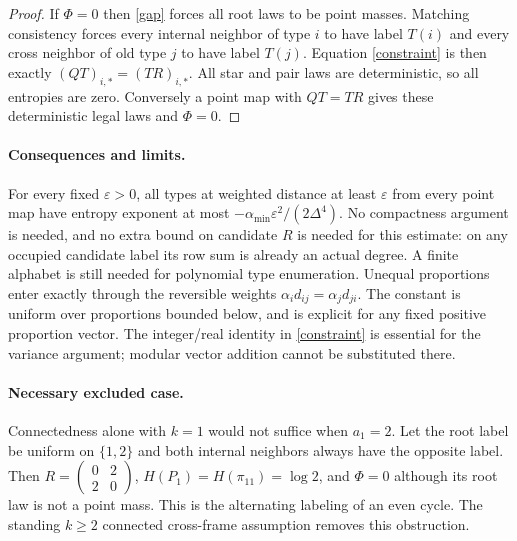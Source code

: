 \documentclass[11pt]{article}
\begin{document}
\begin{proof}
If $\Phi=0$ then \eqref{gap} forces all root laws to be point masses.
Matching consistency forces every internal neighbor of type $i$ to have
label $T(i)$ and every cross neighbor of old type $j$ to have label $T(j)$.
Equation \eqref{constraint} is then exactly $(QT)_{i,*}=(TR)_{i,*}$.
All star and pair laws are deterministic, so all entropies are zero.
Conversely a point map with $QT=TR$ gives these deterministic legal laws
and $\Phi=0$.
\end{proof}

\paragraph{Consequences and limits.}
For every fixed $\varepsilon>0$, all types at weighted distance at least
$\varepsilon$ from every point map have entropy exponent at most
$-\alpha_{\min}\varepsilon^2/(2\Delta^4)$. No compactness argument is
needed, and no extra bound on candidate $R$ is needed for this estimate:
on any occupied candidate label its row sum is already an actual degree.
A finite alphabet is still needed for polynomial type enumeration.
Unequal proportions enter exactly through the reversible weights
$\alpha_i d_{ij}=\alpha_jd_{ji}$. The constant is uniform over proportions
bounded below, and is explicit for any fixed positive proportion vector.
The integer/real identity in \eqref{constraint} is essential for the
variance argument; modular vector addition cannot be substituted there.

\paragraph{Necessary excluded case.}
Connectedness alone with $k=1$ would not suffice when $a_1=2$. Let the
root label be uniform on $\{1,2\}$ and both internal neighbors always
have the opposite label. Then $R=\left(\begin{smallmatrix}0&2\\2&0\end{smallmatrix}\right)$,
$H(P_1)=H(\pi_{11})=\log2$, and $\Phi=0$ although its root law is not a
point mass. This is the alternating labeling of an even cycle. The
standing $k\geq2$ connected cross-frame assumption removes this obstruction.
\end{document}
